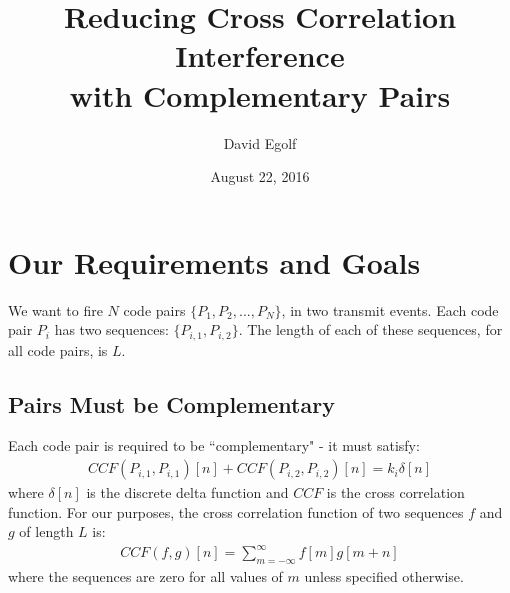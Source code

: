 \documentclass[a4paper]{article}
\title{Reducing Cross Correlation Interference\\ with Complementary Pairs}
\author{David Egolf}
\date{August 22, 2016}
\begin{document}
\maketitle
\section*{Our Requirements and Goals}
We want to fire $N$ code pairs $\{P_1,P_2,...,P_N\}$, in two transmit events. Each code pair $P_i$ has two sequences: $\{P_{i,1},P_{i,2}\}$. The length of each of these sequences, for all code pairs, is $L$.
\subsection*{Pairs Must be Complementary}
Each code pair is required to be ``complementary" - it must satisfy:
\begin{align*}
CCF(P_{i,1},P_{i,1})[n] + CCF(P_{i,2},P_{i,2})[n] = k_i\delta[n]
\end{align*}
where $\delta[n]$ is the discrete delta function and $CCF$ is the cross correlation function. For our purposes, the cross correlation function of two sequences $f$ and $g$ of length $L$ is:
\begin{align*}
CCF(f,g)[n] = \sum_{m=-\infty}^{\infty}f[m]g[m+n]
\end{align*}
where the sequences are zero for all values of $m$ unless specified otherwise.
\end{document}
